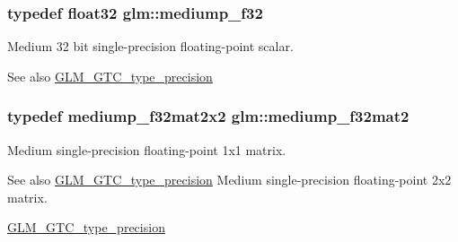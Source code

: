 \subsubsection[{\texorpdfstring{mediump\+\_\+f32}{mediump_f32}}]{\setlength{\rightskip}{0pt plus 5cm}typedef float32 {\bf glm\+::mediump\+\_\+f32}}\hypertarget{group__gtc__type__precision_ga3dbba6bd06a546d7a11d1c09c2f04b1a}{}\label{group__gtc__type__precision_ga3dbba6bd06a546d7a11d1c09c2f04b1a}
Medium 32 bit single-\/precision floating-\/point scalar. \begin{DoxySeeAlso}{See also}
\hyperlink{group__gtc__type__precision}{G\+L\+M\+\_\+\+G\+T\+C\+\_\+type\+\_\+precision} 
\end{DoxySeeAlso}
\subsubsection[{\texorpdfstring{mediump\+\_\+f32mat2}{mediump_f32mat2}}]{\setlength{\rightskip}{0pt plus 5cm}typedef mediump\+\_\+f32mat2x2 {\bf glm\+::mediump\+\_\+f32mat2}}\hypertarget{group__gtc__type__precision_ga103735a38477f7c389b36aae0fbdf274}{}\label{group__gtc__type__precision_ga103735a38477f7c389b36aae0fbdf274}
Medium single-\/precision floating-\/point 1x1 matrix. \begin{DoxySeeAlso}{See also}
\hyperlink{group__gtc__type__precision}{G\+L\+M\+\_\+\+G\+T\+C\+\_\+type\+\_\+precision} Medium single-\/precision floating-\/point 2x2 matrix. 

\hyperlink{group__gtc__type__precision}{G\+L\+M\+\_\+\+G\+T\+C\+\_\+type\+\_\+precision} 
\end{DoxySeeAlso}
